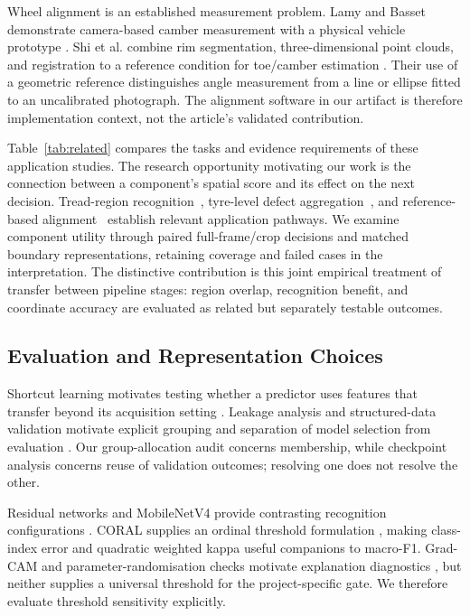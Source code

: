 Wheel alignment is an established measurement problem. Lamy and Basset demonstrate camera-based camber measurement with a physical vehicle prototype \cite{camber2010}. Shi et al. combine rim segmentation, three-dimensional point clouds, and registration to a reference condition for toe/camber estimation \cite{alignment2026}. Their use of a geometric reference distinguishes angle measurement from a line or ellipse fitted to an uncalibrated photograph. The alignment software in our artifact is therefore implementation context, not the article's validated contribution.



Table~\ref{tab:related} compares the tasks and evidence requirements of these application studies. The research opportunity motivating our work is the connection between a component's spatial score and its effect on the next decision. Tread-region recognition~\cite{tread2025}, tyre-level defect aggregation~\cite{mil2025}, and reference-based alignment~\cite{alignment2026} establish relevant application pathways. We examine component utility through paired full-frame/crop decisions and matched boundary representations, retaining coverage and failed cases in the interpretation. The distinctive contribution is this joint empirical treatment of transfer between pipeline stages: region overlap, recognition benefit, and coordinate accuracy are evaluated as related but separately testable outcomes.

\subsection{Evaluation and Representation Choices}
Shortcut learning motivates testing whether a predictor uses features that transfer beyond its acquisition setting \cite{shortcuts}. Leakage analysis and structured-data validation motivate explicit grouping and separation of model selection from evaluation \cite{leakage,groups}. Our group-allocation audit concerns membership, while checkpoint analysis concerns reuse of validation outcomes; resolving one does not resolve the other.

Residual networks and MobileNetV4 provide contrasting recognition configurations \cite{resnet,mobilenet}. CORAL supplies an ordinal threshold formulation \cite{coral}, making class-index error and quadratic weighted kappa useful companions to macro-F1. Grad-CAM and parameter-randomisation checks motivate explanation diagnostics \cite{gradcam,sanity}, but neither supplies a universal threshold for the project-specific gate. We therefore evaluate threshold sensitivity explicitly.

